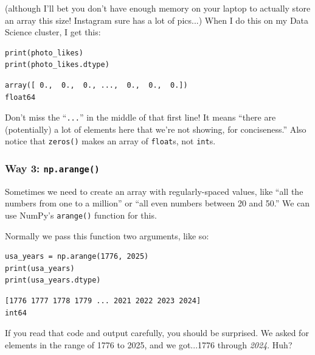 (although I'll bet you don't have enough memory on your laptop to actually
store an array this size! Instagram sure has a lot of pics...) When I do this
on my Data Science cluster, I get this:

\begin{Verbatim}[fontsize=\small,samepage=true,frame=single,framesep=3mm]
print(photo_likes)
print(photo_likes.dtype)
\end{Verbatim}

\begin{Verbatim}[fontsize=\small,samepage=true,frame=leftline,framesep=5mm,framerule=1mm]
array([ 0.,  0.,  0., ...,  0.,  0.,  0.])
float64
\end{Verbatim}

Don't miss the ``\texttt{...}'' in the middle of that first line! It means
``there are (potentially) a lot of elements here that we're not showing, for
conciseness.'' Also notice that \texttt{zeros()} makes an array of
\texttt{float}s, not \texttt{int}s.


\subsubsection{Way 3: \texttt{np.arange()}}

Sometimes we need to create an array with regularly-spaced values, like ``all
the numbers from one to a million'' or ``all even numbers between 20 and 50.''
We can use NumPy's \texttt{arange()} function for this.

Normally we pass this function two arguments, like so:

\begin{Verbatim}[fontsize=\small,samepage=true,frame=single,framesep=3mm]
usa_years = np.arange(1776, 2025)
print(usa_years)
print(usa_years.dtype)
\end{Verbatim}

\begin{Verbatim}[fontsize=\small,samepage=true,frame=leftline,framesep=5mm,framerule=1mm]
[1776 1777 1778 1779 ... 2021 2022 2023 2024]
int64
\end{Verbatim}

If you read that code and output carefully, you should be surprised. We asked
for elements in the range of 1776 to 2025, and we got...1776 through
\textit{2024}. Huh?

\label{arangeNotIncludingLast}

